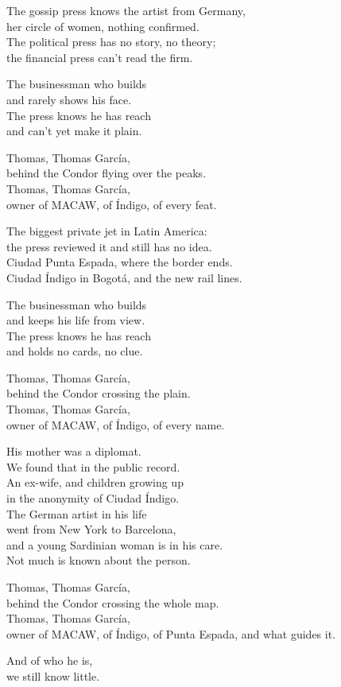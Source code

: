 \begin{lyrics}
The gossip press knows the artist from Germany,\\
her circle of women, nothing confirmed.\\
The political press has no story, no theory;\\
the financial press can't read the firm.

The businessman who builds\\
and rarely shows his face.\\
The press knows he has reach\\
and can't yet make it plain.

Thomas, Thomas García,\\
behind the Condor flying over the peaks.\\
Thomas, Thomas García,\\
owner of MACAW, of Índigo, of every feat.

The biggest private jet in Latin America:\\
the press reviewed it and still has no idea.\\
Ciudad Punta Espada, where the border ends.\\
Ciudad Índigo in Bogotá, and the new rail lines.

The businessman who builds\\
and keeps his life from view.\\
The press knows he has reach\\
and holds no cards, no clue.

Thomas, Thomas García,\\
behind the Condor crossing the plain.\\
Thomas, Thomas García,\\
owner of MACAW, of Índigo, of every name.

His mother was a diplomat.\\
We found that in the public record.\\
An ex-wife, and children growing up\\
in the anonymity of Ciudad Índigo.\\
The German artist in his life\\
went from New York to Barcelona,\\
and a young Sardinian woman is in his care.\\
Not much is known about the person.

Thomas, Thomas García,\\
behind the Condor crossing the whole map.\\
Thomas, Thomas García,\\
owner of MACAW, of Índigo, of Punta Espada, and what guides it.

And of who he is,\\
we still know little.
\end{lyrics}

